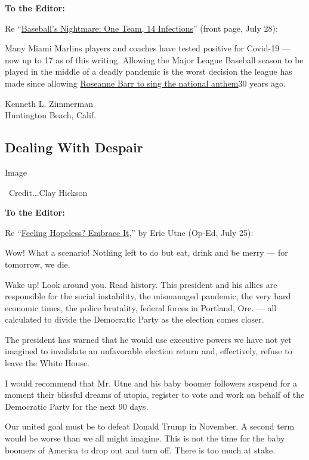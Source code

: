\textbf{To the Editor:}

Re
``\href{https://www.nytimes3xbfgragh.onion/2020/07/27/sports/baseball/marlins-game-canceled.html}{Baseball's
Nightmare: One Team, 14 Infections}'' (front page, July 28):

Many Miami Marlins players and coaches have tested positive for Covid-19
--- now up to 17 as of this writing. Allowing the Major League Baseball
season to be played in the middle of a deadly pandemic is the worst
decision the league has made since allowing
\href{https://www.nytimes3xbfgragh.onion/1990/08/01/opinion/roseanne-barrs-high-art.html}{Roseanne
Barr to sing the national anthem}30 years ago.

Kenneth L. Zimmerman\\
Huntington Beach, Calif.

\hypertarget{dealing-with-despair}{%
\subsection{Dealing With Despair}\label{dealing-with-despair}}

Image

~Credit...Clay Hickson

\textbf{To the Editor:}

Re
``\href{https://www.nytimes3xbfgragh.onion/2020/07/24/opinion/hopeless-covid-climate.html}{Feeling
Hopeless? Embrace It},'' by Eric Utne (Op-Ed, July 25):

Wow! What a scenario! Nothing left to do but eat, drink and be merry ---
for tomorrow, we die.

Wake up! Look around you. Read history. This president and his allies
are responsible for the social instability, the mismanaged pandemic, the
very hard economic times, the police brutality, federal forces in
Portland, Ore. --- all calculated to divide the Democratic Party as the
election comes closer.

The president has warned that he would use executive powers we have not
yet imagined to invalidate an unfavorable election return and,
effectively, refuse to leave the White House.

I would recommend that Mr. Utne and his baby boomer followers suspend
for a moment their blissful dreams of utopia, register to vote and work
on behalf of the Democratic Party for the next 90 days.

Our united goal must be to defeat Donald Trump in November. A second
term would be worse than we all might imagine. This is not the time for
the baby boomers of America to drop out and turn off. There is too much
at stake.

